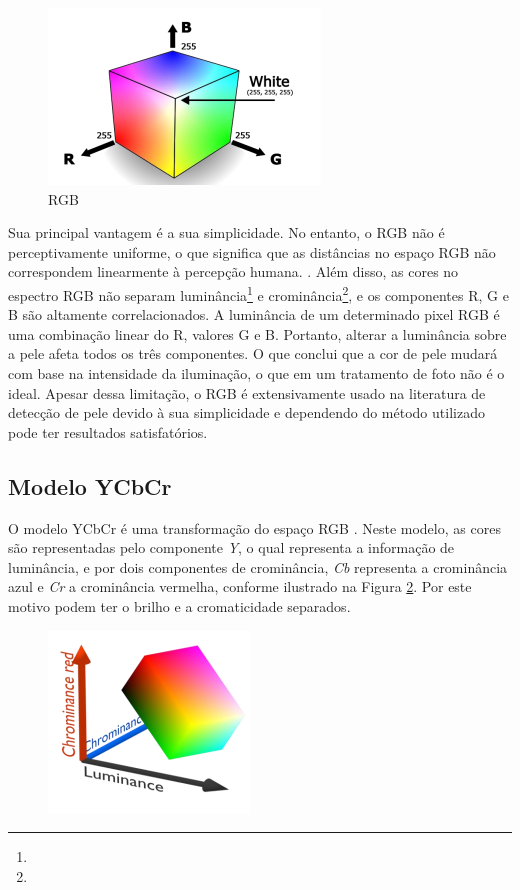 \begin{figure}[h]
\caption{RGB}
\centering

\includegraphics[]{Template_Latex_TCC-UNIFTEC/_lib/imagens/RGB.png}

\label{fig: RGB }
\end{figure}

Sua principal vantagem é a sua simplicidade. No entanto, o RGB não é perceptivamente uniforme, o que significa que as distâncias no espaço RGB não correspondem linearmente à percepção humana. \cite{Skin_detection_ashort_tutorial}. Além disso, as cores no espectro RGB não separam luminância\footnote{} e crominância\footnote{}, e os componentes R, G e B são altamente correlacionados. A luminância de um determinado pixel RGB é uma combinação linear do R, valores G e B. Portanto, alterar a luminância sobre a pele afeta todos os três componentes. O que conclui que a cor de pele mudará com base na intensidade da iluminação, o que em um tratamento de foto não é o ideal. Apesar dessa limitação, o RGB é extensivamente usado na literatura de detecção de pele devido à sua simplicidade e dependendo do método utilizado pode ter resultados satisfatórios.


 \subsection{Modelo YCbCr}
O modelo YCbCr é uma transformação do espaço RGB \cite{Deteccao_de_pele_humana_em_imagens_veiculadas_na_web}. Neste modelo, as cores são representadas pelo componente \textit{Y}, o qual representa a informação de luminância, e por dois componentes de crominância, \textit{Cb} representa a crominância azul e \textit{Cr} a crominância vermelha, conforme ilustrado na Figura \ref{fig: ycbcr }. Por este motivo podem ter o brilho e a cromaticidade separados. 

\begin{figure}[h]
\caption{}
\centering

\includegraphics[]{Template_Latex_TCC-UNIFTEC/_lib/imagens/ycbcr.png}

\label{fig: ycbcr }
\end{figure}

